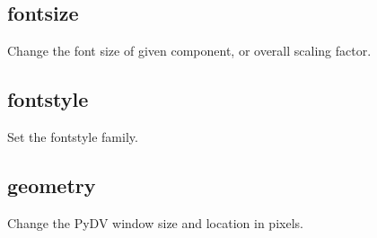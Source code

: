 \documentclass[letterpaper,10pt,english]{sphinxmanual}
\begin{document}
\subsection{fontsize}
\label{\detokenize{plot_control_cmds:fontsize}}
Change the font size of given component, or overall scaling factor.

\begin{sphinxVerbatim}[commandchars=\\\{\}]
\PYG{p}{[}\PYG{p}{]}  \PYG{p}{[}             \PYG{p}{]}         
\end{sphinxVerbatim}


\subsection{fontstyle}
\label{\detokenize{plot_control_cmds:fontstyle}}
Set the fontstyle family.

\begin{sphinxVerbatim}[commandchars=\\\{\}]
\PYG{p}{[}\PYG{p}{]}      
\end{sphinxVerbatim}


\subsection{geometry}
\label{\detokenize{plot_control_cmds:geometry}}
Change the PyDV window size and location in pixels.

\begin{sphinxVerbatim}[commandchars=\\\{\}]
\PYG{p}{[}\PYG{p}{]}     
\end{sphinxVerbatim}
\end{document}
